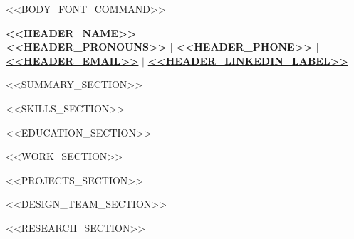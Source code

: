 \documentclass[10pt,a4paper]{article}
\begin{document}
<<BODY_FONT_COMMAND>>

\begin{center}
    {\fontsize{19}{21}\selectfont \textbf{<<HEADER_NAME>>}}\\[4pt]
    \textbf{<<HEADER_PRONOUNS>>} \quad $|$ \quad \textbf{<<HEADER_PHONE>>} \quad $|$ \quad
    \href{mailto:<<HEADER_EMAIL>>}{\textbf{<<HEADER_EMAIL>>}} \quad $|$ \quad
    \href{<<HEADER_LINKEDIN_URL>>}{\textbf{<<HEADER_LINKEDIN_LABEL>>}}
\end{center}

<<SUMMARY_SECTION>>

<<SKILLS_SECTION>>

<<EDUCATION_SECTION>>

<<WORK_SECTION>>

<<PROJECTS_SECTION>>

<<DESIGN_TEAM_SECTION>>

<<RESEARCH_SECTION>>
\end{document}
